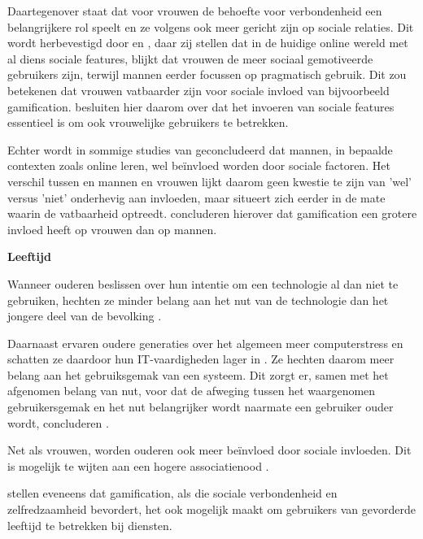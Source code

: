 Daartegenover staat dat voor vrouwen de behoefte voor verbondenheid een belangrijkere rol speelt \autocite{Hoffman1972} en ze volgens \textcite{Minton1980, Spence1980} ook meer gericht zijn op sociale relaties. Dit wordt herbevestigd door \textcite{Haferkamp2012} en \textcite{Muscanell2012}, daar zij stellen dat in de huidige online wereld met al diens sociale features, blijkt dat vrouwen de meer sociaal gemotiveerde gebruikers zijn, terwijl mannen eerder focussen op pragmatisch gebruik. Dit zou betekenen dat vrouwen vatbaarder zijn voor sociale invloed van bijvoorbeeld gamification. \textcite{Koivisto2014} besluiten hier daarom over dat het invoeren van sociale features essentieel is om ook vrouwelijke gebruikers te betrekken.

Echter wordt in sommige studies van \textcite{Wang2008} geconcludeerd dat mannen, in bepaalde contexten zoals online leren, wel beïnvloed worden door sociale factoren. Het verschil tussen en mannen en vrouwen lijkt daarom geen kwestie te zijn van 'wel' versus 'niet' onderhevig aan invloeden, maar situeert zich eerder in de mate waarin de vatbaarheid optreedt. \textcite{PoloPena2020} concluderen hierover dat gamification een grotere invloed heeft op vrouwen dan op mannen.

\vspace{2mm}
\textbf{Leeftijd}
\vspace{1mm}

Wanneer ouderen beslissen over hun intentie om een technologie al dan niet te gebruiken, hechten ze minder belang aan het nut van de technologie dan het jongere deel van de bevolking \autocite{Venkatesh2003}.

Daarnaast ervaren oudere generaties over het algemeen meer computerstress en schatten ze daardoor hun IT-vaardigheden lager in \autocite{Chung2010}. Ze hechten daarom meer belang aan het gebruiksgemak van een systeem. Dit zorgt er, samen met het afgenomen belang van nut, voor dat de afweging tussen het waargenomen gebruikersgemak en het nut belangrijker wordt naarmate een gebruiker ouder wordt, concluderen \textcite{Melenhorst2001}.

Net als vrouwen, worden ouderen ook meer beïnvloed door sociale invloeden. Dit is mogelijk te wijten aan een hogere associatienood \autocite{Morris2000, Venkatesh2000, Wang2008}.

\textcite{Arning2007, Czaja2006} stellen eveneens dat gamification, als die sociale verbondenheid en zelfredzaamheid bevordert, het ook mogelijk maakt om gebruikers van gevorderde leeftijd te betrekken bij diensten.

